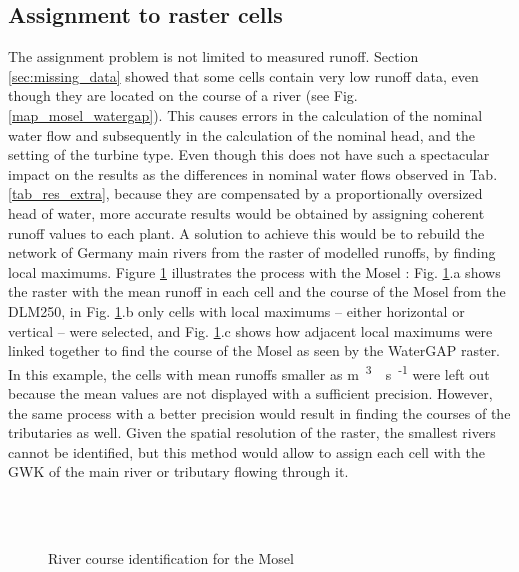 \subsection{Assignment to raster cells}
\label{sub:imp_assign_cell}
The assignment problem is not limited to measured runoff. Section \ref{sec:missing_data} showed that some cells contain very low runoff data, even though they are located on the course of a river (see Fig. \ref{map_mosel_watergap}). This causes errors in the calculation of the nominal water flow and subsequently in the calculation of the nominal head, and the setting of the turbine type. Even though this does not have such a spectacular impact on the results as the differences in nominal water flows observed in Tab. \ref{tab_res_extra}, because they are compensated by a proportionally oversized head of water, more accurate results would be obtained by assigning coherent runoff values to each plant. \newline
A solution to achieve this would be to rebuild the network of Germany main rivers from the raster of modelled runoffs, by finding local maximums. Figure \ref{imp_mosel} illustrates the process with the Mosel : Fig. \ref{imp_mosel}.a shows the raster with the mean runoff in each cell and the course of the Mosel from the DLM250, in Fig. \ref{imp_mosel}.b only cells with local maximums -- either horizontal or vertical -- were selected, and Fig. \ref{imp_mosel}.c shows how adjacent local maximums were linked together to find the course of the Mosel as seen by the WaterGAP raster. \newline
In this example, the cells with mean runoffs smaller as \unit[1]{m\textsuperscript{3}\textperiodcentered s\textsuperscript{-1}} were left out because the mean values are not displayed with a sufficient precision. However, the same process with a better precision would result in finding the courses of the tributaries as well. Given the spatial resolution of the raster, the smallest rivers cannot be identified, but this method would allow to assign each cell with the GWK of the main river or tributary flowing through it.

\begin{figure}[H]
\begin{center}
   \\
   \\
\end{center}
\caption{River course identification for the Mosel}
\label{imp_mosel}
\end{figure}

